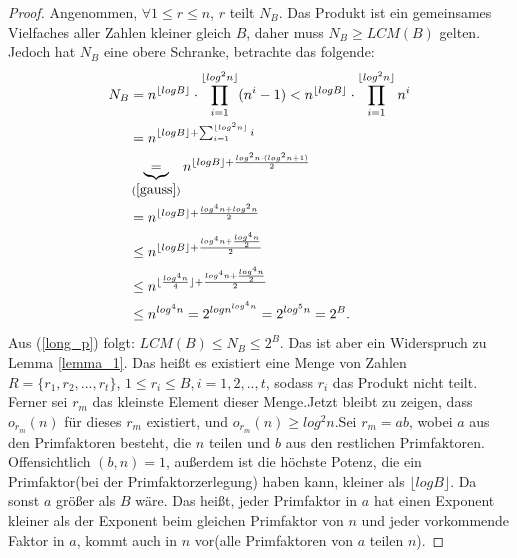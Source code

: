 \documentclass[12pt,oneside]{article}
\theoremstyle{remark}
\theoremstyle{definition}
\begin{document}
\begin{proof}
Angenommen, $\forall 1 \leq r \leq n$, $r$ teilt $N_{B}$. Das Produkt ist ein gemeinsames Vielfaches aller Zahlen kleiner gleich $B$, daher muss $N_{B} \geq LCM(B)$ gelten. Jedoch hat $N_{B}$ eine obere Schranke, betrachte das folgende:
\begin{equation}\label{long_p}
    \begin{split}
        \begin{aligned}
            N_{B} &= n^{\lfloor log B \rfloor } \cdot \prod_{i = 1}^{\lfloor log^2 n \rfloor} (n^i - 1)
                < n^{\lfloor log B \rfloor } \cdot \prod_{i = 1}^{\lfloor log^2 n \rfloor} n^i \\
                &= n^{\lfloor log B \rfloor + \sum_{i = 1}^{\lfloor log^2 n \rfloor } i}\\ 
                &\underbrace{=}_{(\ref{gauss})} n^{\lfloor log B \rfloor + \frac{log^2 n \cdot (log^2 n + 1)}{2}}  \\
                &= n^{\lfloor log B \rfloor + \frac{log^4 n + log^2 n}{2}}\\
                & \leq n^{\lfloor log B \rfloor + \frac{log^4 n + \frac{log^4 n}{2}}{2}}\\
                & \leq n^{\lfloor \frac{log^4 n}{4} \rfloor + \frac{log^4 n + \frac{log^4 n}{2}}{2}}\\
                & \leq n^{log^4 n} = 2^{log n^{log^4 n}} = 2^{log^5 n} = 2^{B}.
        \end{aligned}
    \end{split}
\end{equation}
Aus (\ref{long_p}) folgt: $LCM(B) \leq N_{B} \leq 2^B$. Das ist aber ein Widerspruch zu Lemma \ref{lemma_1}. Das heißt es existiert eine Menge von Zahlen $R = \{r_{1},r_{2},...,r_{t}\}$, $ 1 \leq r_i \leq B$,$\, i = 1,2, ..,t$, sodass $r_{i}$ das Produkt nicht teilt. Ferner sei $r_{m}$ das kleinste Element dieser Menge.\newline\newline Jetzt bleibt zu zeigen, dass $o_{r_{m}}(n)$ für dieses $r_{m}$ existiert, und $o_{r_{m}}(n) \geq log^2 n$.\newline\newline Sei $r_{m} = ab $, wobei $a$ aus den Primfaktoren besteht, die $n$ teilen und $b$ aus den restlichen Primfaktoren. Offensichtlich $(b,n) = 1$, außerdem ist die höchste Potenz, die ein Primfaktor(bei der Primfaktorzerlegung) haben kann, kleiner als $\lfloor log B \rfloor$. Da sonst $a$ größer als $B$ wäre. Das heißt, jeder Primfaktor in $a$ hat einen Exponent kleiner als der Exponent beim gleichen Primfaktor von $n$ und jeder vorkommende Faktor in $a$, kommt auch in $n$ vor(alle Primfaktoren von $a$ teilen $n$).\newline

\end{proof}
\end{document}
